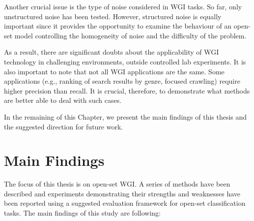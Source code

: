 Another crucial issue is the type of noise considered in WGI tasks. So far, only unstructured noise has been tested. However, structured noise is equally important since it provides the opportunity to examine the behaviour of an open-set model controlling the homogeneity of noise and the difficulty of the problem. 

As a result, there are significant doubts about the applicability of WGI technology in challenging environments, outside controlled lab experiments. It is also important to note that not all WGI applications are the same. Some applications (e.g., ranking of search results by genre, focused crawling) require higher precision than recall. It is crucial, therefore, to demonstrate what methods are better able to deal with such cases.

In the remaining of this Chapter, we present the main findings of this thesis and the suggested direction for future work.

\section{Main Findings}

The focus of this thesis is on open-set WGI. A series of methods have been described and experiments demonstrating their strengths and weaknesses have been reported using a suggested evaluation framework for open-set classification tasks. The main findings of this study are following:


